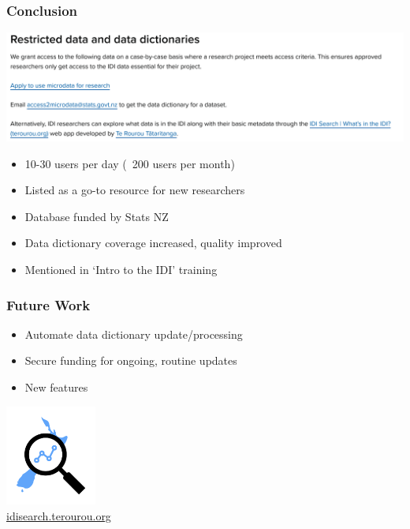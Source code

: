\documentclass{beamer}
\begin{document}
\begin{frame}
    \frametitle{Conclusion}

    \includegraphics[width=\linewidth]{conc1.png}

    \begin{itemize}
        \item 10-30 users per day (~200 users per month)
        \item Listed as a go-to resource for new researchers
        \item Database funded by Stats NZ
        \item Data dictionary coverage increased, quality improved
        \item Mentioned in `Intro to the IDI' training
    \end{itemize}
\end{frame}

\begin{frame}
    \frametitle{Future Work}

    \begin{itemize}
        \item Automate data dictionary update/processing
        \item Secure funding for ongoing, routine updates
        \item New features
    \end{itemize}
\end{frame}

\begin{frame}

    \begin{center}
        \includegraphics[width=3cm]{idisearch}\\
        \url{idisearch.terourou.org}
    \end{center}
\end{frame}
\end{document}
